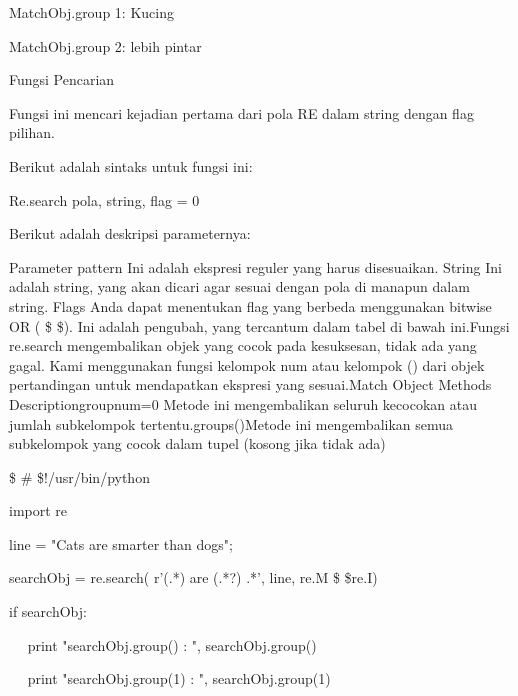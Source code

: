 \noindent 
MatchObj.group {1}: Kucing \par
\noindent 
MatchObj.group {2}: lebih pintar \par
\vspace{12pt}
Fungsi Pencarian \par
\vspace{12pt}
Fungsi ini mencari kejadian pertama dari pola RE dalam string dengan flag pilihan. \par
\vspace{12pt}
Berikut adalah sintaks untuk fungsi ini: \par
\vspace{12pt}
Re.search {pola, string, flag = 0} \par
\vspace{12pt}
\noindent 
Berikut adalah deskripsi parameternya: \par
Parameter pattern Ini adalah ekspresi reguler yang harus disesuaikan. String Ini adalah string, yang akan dicari agar sesuai dengan pola di manapun dalam string. Flags Anda dapat menentukan flag yang berbeda menggunakan bitwise OR ( \$  \vert  \$). Ini adalah pengubah, yang tercantum dalam tabel di bawah ini.Fungsi re.search mengembalikan objek yang cocok pada kesuksesan, tidak ada yang gagal. Kami menggunakan fungsi kelompok {num} atau kelompok () dari objek pertandingan untuk mendapatkan ekspresi yang sesuai.Match Object Methods Descriptiongroup{num=0} Metode ini mengembalikan seluruh kecocokan atau jumlah subkelompok tertentu.groups()Metode ini mengembalikan semua subkelompok yang cocok dalam tupel (kosong jika tidak ada) \par
\vspace{12pt}
\vspace{12pt}
\noindent 
 \$  \#  \$!/usr/bin/python \par
\noindent 
import re \par
\vspace{12pt}
\noindent 
line = "Cats are smarter than dogs"; \par
\vspace{12pt}
\noindent 
searchObj = re.search( r'(.*) are (.*?) .*', line, re.M \$  \vert  \$re.I) \par
\vspace{12pt}
\noindent 
if searchObj: \par
\noindent 
~~ print "searchObj.group() : ", searchObj.group() \par
\noindent 
~~ print "searchObj.group(1) : ", searchObj.group(1) \par
